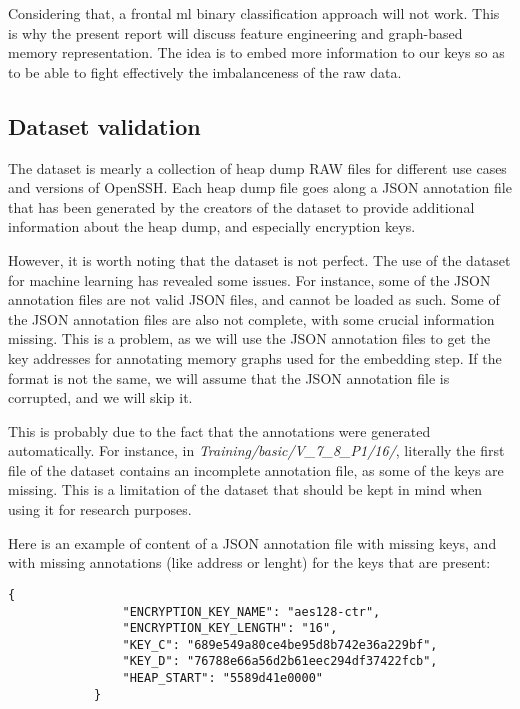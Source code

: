     Considering that, a frontal \acrshort{ml} binary classification approach will not work. This is why the present report will discuss feature engineering and graph-based memory representation. The idea is to embed more information to our keys so as to be able to fight effectively the imbalanceness of the raw data.

    \subsection{Dataset validation}
    The dataset is mearly a collection of heap dump RAW files for different use cases and versions of OpenSSH. Each heap dump file goes along a JSON annotation file that has been generated by the creators of the dataset to provide additional information about the heap dump, and especially encryption keys.
    
    However, it is worth noting that the dataset is not perfect. The use of the dataset for machine learning has revealed some issues. For instance, some of the JSON annotation files are not valid JSON files, and cannot be loaded as such. Some of the JSON annotation files are also not complete, with some crucial information missing. This is a problem, as we will use the JSON annotation files to get the key addresses for annotating memory graphs used for the embedding step. If the format is not the same, we will assume that the JSON annotation file is corrupted, and we will skip it.
    
    This is probably due to the fact that the annotations were generated automatically. For instance, in \textit{Training/basic/V\_7\_8\_P1/16/}, literally the first file of the dataset contains an incomplete annotation file, as some of the keys are missing. This is a limitation of the dataset that should be kept in mind when using it for research purposes.

    \begin{minipage}{\dimexpr\linewidth-20pt}
        Here is an example of content of a JSON annotation file with missing keys, and with missing annotations (like address or lenght) for the keys that are present:

        \begin{lstlisting}[style=json, caption={Missing keys in JSON annotation file \textit{Training/basic/V\_6\_0\_P1/16/24375-1644243522.json}}]
            {
                "ENCRYPTION_KEY_NAME": "aes128-ctr",
                "ENCRYPTION_KEY_LENGTH": "16",
                "KEY_C": "689e549a80ce4be95d8b742e36a229bf",
                "KEY_D": "76788e66a56d2b61eec294df37422fcb",
                "HEAP_START": "5589d41e0000"
            }
        \end{lstlisting}
    \end{minipage}

